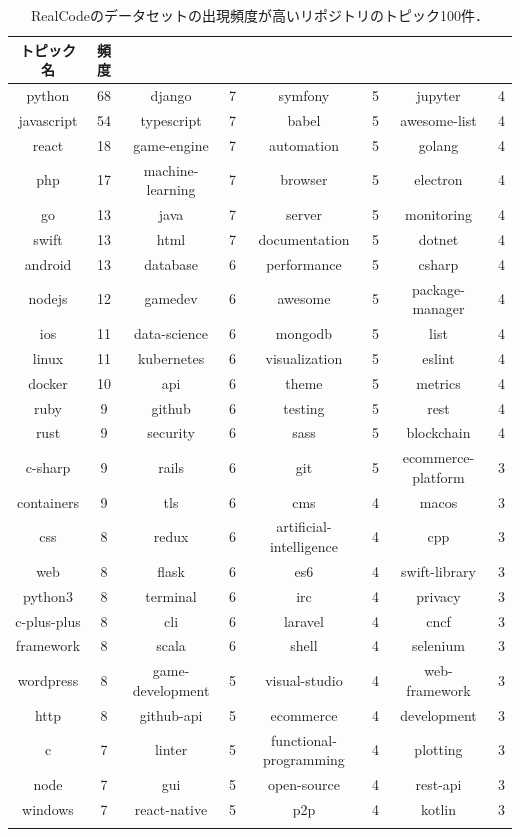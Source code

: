 \begin{table}[!b]
\small
    \centering
    \caption{RealCodeのデータセットの出現頻度が高いリポジトリのトピック100件．}
    \label{table:repo_topic_freq}
    \begin{tabular}{ c | c || c | c || c | c || c | c} \Xhline{3\arrayrulewidth}
        トピック名 & 頻度 &  &  &  &  &  & \\ \hline \hline
        python & 68 & django & 7 & symfony & 5 & jupyter & 4 \\
        javascript & 54 & typescript & 7 & babel & 5 & awesome-list & 4 \\
        react & 18 & game-engine & 7 & automation & 5 & golang & 4 \\
        php & 17 & machine-learning & 7 & browser & 5 & electron & 4 \\
        go & 13 & java & 7 & server & 5 & monitoring & 4 \\
        swift & 13 & html & 7 & documentation & 5 & dotnet & 4 \\
        android & 13 & database & 6 & performance & 5 & csharp & 4 \\
        nodejs & 12 & gamedev & 6 & awesome & 5 & package-manager & 4 \\
        ios & 11 & data-science & 6 & mongodb & 5 & list & 4 \\
        linux & 11 & kubernetes & 6 & visualization & 5 & eslint & 4 \\
        docker & 10 & api & 6 & theme & 5 & metrics & 4 \\
        ruby & 9 & github & 6 & testing & 5 & rest & 4 \\
        rust & 9 & security & 6 & sass & 5 & blockchain & 4 \\
        c-sharp & 9 & rails & 6 & git & 5 & ecommerce-platform & 3 \\
        containers & 9 & tls & 6 & cms & 4 & macos & 3 \\
        css & 8 & redux & 6 & artificial-intelligence & 4 & cpp & 3 \\
        web & 8 & flask & 6 & es6 & 4 & swift-library & 3 \\
        python3 & 8 & terminal & 6 & irc & 4 & privacy & 3 \\
        c-plus-plus & 8 & cli & 6 & laravel & 4 & cncf & 3 \\
        framework & 8 & scala & 6 & shell & 4 & selenium & 3 \\
        wordpress & 8 & game-development & 5 & visual-studio & 4 & web-framework & 3 \\
        http & 8 & github-api & 5 & ecommerce & 4 & development & 3 \\
        c & 7 & linter & 5 & functional-programming & 4 & plotting & 3 \\
        node & 7 & gui & 5 & open-source & 4 & rest-api & 3 \\
        windows & 7 & react-native & 5 & p2p & 4 & kotlin & 3 \\
        \Xhline{3\arrayrulewidth}
    \end{tabular}
\end{table}

